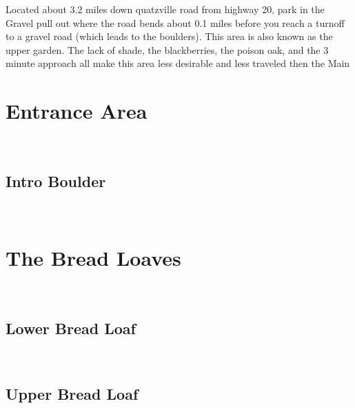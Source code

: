 \begin{multicols}{2}
\begin{minipage}{\columnwidth}
Located about 3.2 miles down quatzville road from highway 20, park in the Gravel pull out where the road bends about 0.1 miles before you reach a turnoff to a gravel road (which leads to the boulders). This area is also known as the upper garden. The lack of shade, the blackberries, the poison oak, and the 3 minute approach all make this area less desirable and less traveled then the Main
\end{minipage}

\newpage
		\section{Entrance Area}\label{sa:Entrance Area}
	\begin{minipage}{\columnwidth}
	\
	\end{minipage}
	
			\begin{minipage}{\columnwidth}
			\subsection*{Intro Boulder}\label{bf:Intro Boulder}
			\
			
			\end{minipage}
			
\newpage
		\section{The Bread Loaves}\label{sa:The Bread Loaves}
	\begin{minipage}{\columnwidth}
	\
	\end{minipage}
	
			\begin{minipage}{\columnwidth}
			\subsection*{Lower Bread Loaf}\label{bf:Lower Bread Loaf}
			\
			
			\end{minipage}
			
			\begin{minipage}{\columnwidth}
			\subsection*{Upper Bread Loaf}\label{bf:Upper Bread Loaf}
			\
			

\end{minipage}
\end{multicols}
